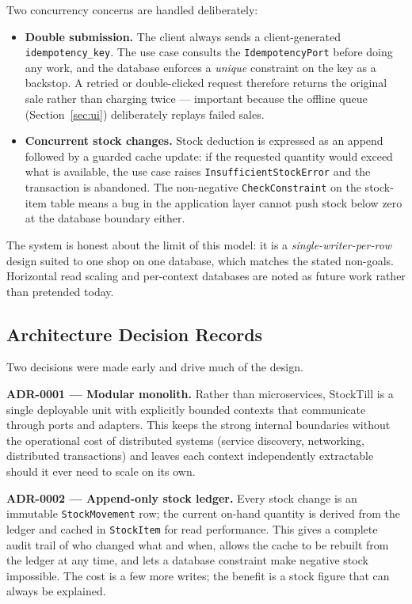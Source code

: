 \documentclass[11pt,a4paper]{article}
\begin{document}
Two concurrency concerns are handled deliberately:

\begin{itemize}[leftmargin=1.4em]
  \item \textbf{Double submission.} The client always sends a client-generated
  \texttt{idempotency\_key}. The use case consults the \texttt{IdempotencyPort} before doing any
  work, and the database enforces a \emph{unique} constraint on the key as a backstop. A retried or
  double-clicked request therefore returns the original sale rather than charging twice --- important
  because the offline queue (Section~\ref{sec:ui}) deliberately replays failed sales.
  \item \textbf{Concurrent stock changes.} Stock deduction is expressed as an append followed by a
  guarded cache update: if the requested quantity would exceed what is available, the use case raises
  \texttt{InsufficientStockError} and the transaction is abandoned. The non-negative
  \texttt{CheckConstraint} on the stock-item table means a bug in the application layer cannot push
  stock below zero at the database boundary either.
\end{itemize}

\noindent
The system is honest about the limit of this model: it is a \emph{single-writer-per-row} design suited
to one shop on one database, which matches the stated non-goals. Horizontal read scaling and
per-context databases are noted as future work rather than pretended today.

\subsection{Architecture Decision Records}

Two decisions were made early and drive much of the design.

\textbf{ADR-0001 --- Modular monolith.} Rather than microservices, StockTill is a single deployable
unit with explicitly bounded contexts that communicate through ports and adapters. This keeps the
strong internal boundaries without the operational cost of distributed systems (service discovery,
networking, distributed transactions) and leaves each context independently extractable should it
ever need to scale on its own.

\textbf{ADR-0002 --- Append-only stock ledger.} Every stock change is an immutable
\texttt{StockMovement} row; the current on-hand quantity is derived from the ledger and cached in
\texttt{StockItem} for read performance. This gives a complete audit trail of who changed what and
when, allows the cache to be rebuilt from the ledger at any time, and lets a database constraint make
negative stock impossible. The cost is a few more writes; the benefit is a stock figure that can
always be explained.
\end{document}

